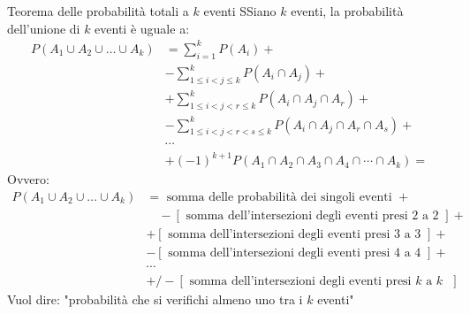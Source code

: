 \documentclass{article}  %
\theoremstyle{definition}
\begin{document}
\begin{theorem}{Teorema delle probabilità totali a $k$ eventi}
	SSiano $k$ eventi, la probabilità dell'unione di $k$ eventi è uguale a:
	\begin{align*}
		P(A_1 \cup A_2 \cup \dots \cup A_k)
		 & = \sum_{i=1}^{k} P(A_i) +                                              \\
		 & - \sum_{1 \leq i<j\leq k}^{k} P(A_i \cap A_j) +                        \\
		 & + \sum_{1 \leq i<j<r \leq k}^{k} P(A_i \cap A_j \cap A_r) +            \\
		 & - \sum_{1 \leq i<j<r<s \leq k}^{k} P(A_i \cap A_j \cap A_r \cap A_s) + \\
		 & \cdots                                                                 \\
		 & +(-1)^{k+1}P(A_1 \cap A_2 \cap A_3 \cap A_4 \cap \cdots \cap A_k) =
	\end{align*}
	Ovvero:
	\begin{align*}
		P(A_1 \cup A_2 \cup \dots \cup A_k)
		 & = \text{ somma delle probabilità dei singoli eventi } +               \\
		 & \quad - [\text{ somma dell'intersezioni degli eventi presi 2 a 2 }] + \\
		 & + [\text{ somma dell'intersezioni degli eventi presi 3 a 3 }] +       \\
		 & - [\text{ somma dell'intersezioni degli eventi presi 4 a 4 }] +       \\
		 & \cdots                                                                \\
		 & +/- [\text{ somma dell'intersezioni degli eventi presi $k$ a $k$ }]
	\end{align*}
	Vuol dire: "probabilità che si verifichi almeno uno tra i $k$ eventi"
\end{theorem}
\end{document}
